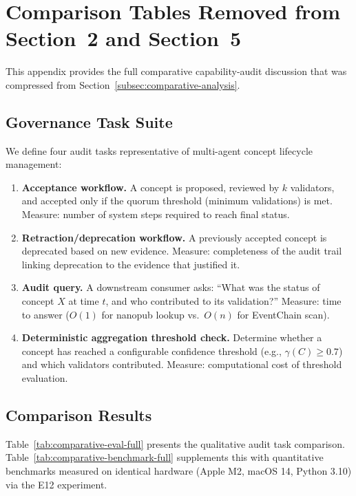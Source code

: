 \section{Comparison Tables Removed from Section~2 and Section~5}\label{app:comparison-tables}

This appendix provides the full comparative capability-audit discussion that was compressed from Section~\ref{subsec:comparative-analysis}.

\subsection{Governance Task Suite}

We define four audit tasks representative of multi-agent concept lifecycle management:

\begin{enumerate}[label=(\arabic*)]
    \item \textbf{Acceptance workflow.} A concept is proposed, reviewed by $k$ validators, and accepted only if the quorum threshold (minimum validations) is met. Measure: number of system steps required to reach final status.
    \item \textbf{Retraction/deprecation workflow.} A previously accepted concept is deprecated based on new evidence. Measure: completeness of the audit trail linking deprecation to the evidence that justified it.
    \item \textbf{Audit query.} A downstream consumer asks: ``What was the status of concept $X$ at time $t$, and who contributed to its validation?'' Measure: time to answer ($O(1)$ for nanopub lookup vs.\ $O(n)$ for EventChain scan).
    \item \textbf{Deterministic aggregation threshold check.} Determine whether a concept has reached a configurable confidence threshold (e.g., $\gamma(C) \geq 0.7$) and which validators contributed. Measure: computational cost of threshold evaluation.
\end{enumerate}

\subsection{Comparison Results}

Table~\ref{tab:comparative-eval-full} presents the qualitative audit task comparison. Table~\ref{tab:comparative-benchmark-full} supplements this with quantitative benchmarks measured on identical hardware (Apple M2, macOS 14, Python 3.10) via the E12 experiment.

